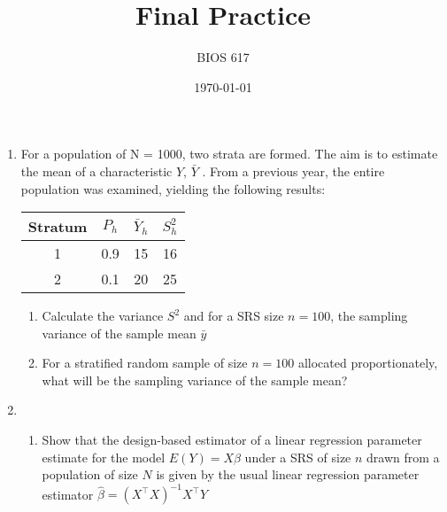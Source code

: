 \documentclass[12pt]{article}
\begin{document}
\title{Final Practice}
\author{BIOS 617}
\date{\today}

\maketitle

\begin{enumerate}
\setlength{\itemsep}{15pt}%
\setlength{\parskip}{15pt}%

\item For a population of N = 1000, two strata are formed. The aim is to estimate the mean of a characteristic $Y$, $\bar Y$ . From a previous year, the entire population was examined, yielding the following results:

\begin{table}[!th]
\centering
\begin{tabular}{c c c c}
\hline
Stratum & $P_h$ & $\bar Y_h$ & $S_h^2$ \\ \hline
1 & 0.9 & 15 & 16 \\
2 & 0.1 & 20 & 25 \\ \hline
\end{tabular}
\end{table}

\begin{enumerate}
	\item Calculate the variance $S^2$ and for a SRS size $n=100$, the sampling variance of the sample mean $\bar y$
	\vspace{2in}

	\item For a stratified random sample of size $n=100$ allocated proportionately, what will be the sampling variance of the sample mean?
\end{enumerate}
\newpage

\item
	\begin{enumerate}
	\item Show that the design-based estimator of a linear regression parameter estimate for the model $E(Y) = X \beta$ under a SRS of size $n$ drawn from a population of size $N$ is given by the usual linear regression parameter estimator $\hat \beta = (X^\top X)^{-1} X^\top Y$
	\vspace{2.5in}


\end{enumerate}
\end{enumerate}
\end{document}
